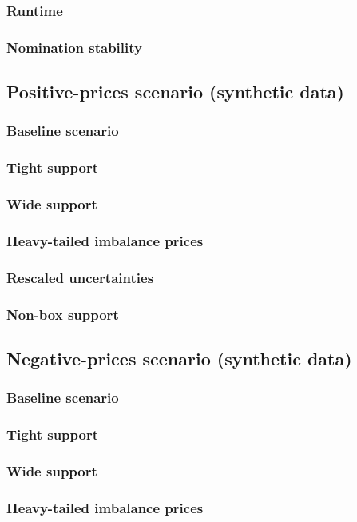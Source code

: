 \documentclass[11pt]{article}
\theoremstyle{plain}
\theoremstyle{definition}
\begin{document}
\subsubsection{Runtime}
\subsubsection{Nomination stability}
\subsection{Positive-prices scenario (synthetic data)}
\subsubsection{Baseline scenario}
\subsubsection{Tight support}
\subsubsection{Wide support}
\subsubsection{Heavy-tailed imbalance prices}
\subsubsection{Rescaled uncertainties}
\subsubsection{Non-box support}
\subsection{Negative-prices scenario (synthetic data)}
\subsubsection{Baseline scenario}
\subsubsection{Tight support}
\subsubsection{Wide support}
\subsubsection{Heavy-tailed imbalance prices}
\end{document}
